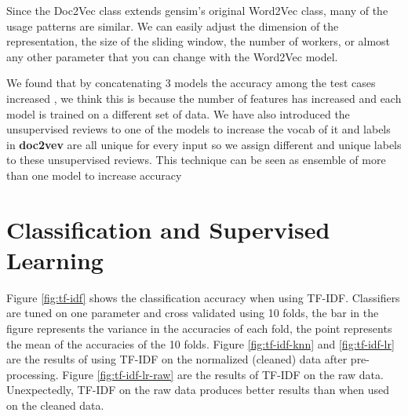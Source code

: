 \documentclass{article}
\begin{document}
	Since the Doc2Vec class extends gensim’s original Word2Vec class, many of the usage patterns are similar. We can easily adjust the dimension of the representation, the size of the sliding window, the number of workers, or almost any other parameter that you can change with the Word2Vec model.
	
	We found that by concatenating 3 models the accuracy among the test cases increased , we think this is because the number of features has increased and each model is trained on a different set of data. We have also introduced the unsupervised reviews to one of the models to increase the vocab of it and labels in \textbf{doc2vev} are all unique for every input so we assign different and unique labels to these unsupervised reviews. This technique can be seen as ensemble of more than one model to increase accuracy 
	\medskip
	
	
	
	\section{Classification and Supervised Learning}
	
	Figure \ref{fig:tf-idf} shows the classification accuracy when using TF-IDF. Classifiers are tuned on one parameter and cross validated using 10 folds, the bar in the figure represents the variance in the accuracies of each fold, the point represents the mean of the accuracies of the 10 folds. Figure \ref{fig:tf-idf-knn} and \ref{fig:tf-idf-lr} are the results of using TF-IDF on the normalized (cleaned) data after pre-processing. Figure \ref{fig:tf-idf-lr-raw} are the results of TF-IDF on the raw data. Unexpectedly, TF-IDF on the raw data produces better results than when used on the cleaned data.
	
\end{document}
